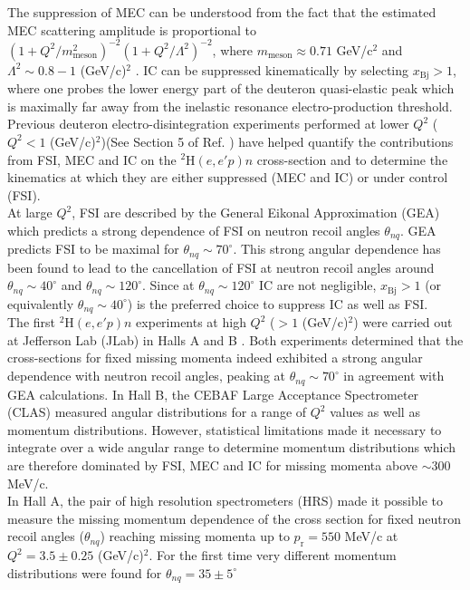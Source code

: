 The suppression of MEC can be understood from the fact that the estimated MEC scattering amplitude is proportional to  $(1 + Q^{2}/m^{2}_{\mathrm{meson}})^{-2}(1+Q^{2}/\Lambda^{2})^{-2}$, where $m_{\mathrm{meson}}\approx0.71$ GeV/c$^{2}$ and
$\Lambda^{2}\sim 0.8-1 $ (GeV/c)$^{2}$ \cite{Sargsian_2001}. IC can be suppressed kinematically by selecting $x_{\mathrm{Bj}}>1$, where one probes the lower energy part of the deuteron quasi-elastic peak which is maximally far away from the inelastic resonance
electro-production threshold. Previous deuteron electro-disintegration experiments performed at lower $Q^{2}$ ($Q^{2}<1$ (GeV/c)$^{2}$)(See Section 5 of Ref. \cite{sargsian_2015}) have helped quantify the contributions
from FSI, MEC and IC on the $^{2}\mathrm{H}(e,e'p)n$ cross-section and to determine the kinematics at which they are either suppressed (MEC and IC) or under control (FSI).  \\
\indent At large $Q^{2}$, FSI are described by the General Eikonal Approximation (GEA) \cite{Sargsian_2001,PhysRevC.56.1124,sargsian_2015} which predicts a strong dependence of FSI on neutron recoil angles $\theta_{nq}$.
GEA predicts FSI to be maximal for $\theta_{nq}\sim70^{\circ}$. This strong angular dependence has been found to lead to the cancellation of FSI at neutron recoil angles around $\theta_{nq}\sim40^{\circ}$ and $\theta_{nq}\sim120^{\circ}$. Since at $\theta_{nq}\sim120^{\circ}$ IC are not negligible, $x_{\mathrm{Bj}}>1$ (or equivalently $\theta_{nq}\sim40^{\circ}$) is the preferred choice to suppress IC as well as FSI. \\
\indent The first $^{2}\mathrm{H}(e,e'p)n$ experiments at high $Q^{2}$ ($>1$ (GeV/c)$^{2}$) were carried out at Jefferson Lab (JLab) in Halls A \cite{PhysRevLett.107.262501} and B \cite{PhysRevLett.98.262502}. Both
experiments determined that the cross-sections for fixed missing momenta indeed exhibited a strong angular dependence with neutron recoil angles, peaking
at $\theta_{nq} \sim 70^{\circ}$ in agreement with GEA \cite{Sargsian_2001,PhysRevC.56.1124} calculations. In Hall B, the CEBAF Large Acceptance Spectrometer (CLAS) measured angular
distributions for  a range of $Q^2$ values as well as momentum distributions. However, statistical limitations made it necessary to integrate over a wide angular range to determine momentum distributions
which are therefore dominated by  FSI, MEC and IC for missing momenta above $\sim 300$ MeV/c. \\
\indent In Hall A, the pair of high resolution spectrometers (HRS) made it possible to measure the missing momentum dependence of the cross section for fixed neutron recoil angles ($\theta_{nq}$) reaching missing momenta up to $p_{\mathrm{r}}=550$ MeV/c at $Q^{2}=3.5\pm0.25$ (GeV/c)$^{2}$. For the first time very different momentum distributions were found for $\theta_{nq}=35\pm5^{\circ}$
